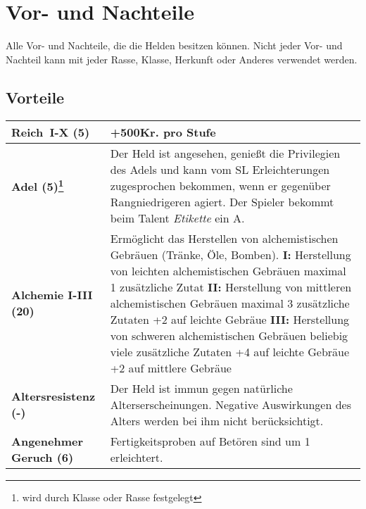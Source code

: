 {\let\clearpage\relax\chapter{Vor- und Nachteile}
\label{chap:vor_und_nachteile}}
Alle Vor- und Nachteile, die die Helden besitzen können. Nicht jeder Vor- und Nachteil kann mit jeder Rasse, Klasse, Herkunft oder Anderes verwendet werden.

\section{Vorteile}
\label{chap:vorteile}
\begin{longtable}{|p{5cm}|p{11cm}|}

\hline
\textbf{Reich~I-X (5)} & +500Kr. pro Stufe \\ \hline

\textbf{Adel (5)\footnote{wird durch Klasse oder Rasse festgelegt}} & Der Held ist angesehen, genießt die Privilegien des Adels und kann vom SL Erleichterungen zugesprochen bekommen, wenn er gegenüber Rangniedrigeren agiert. Der Spieler bekommt beim Talent \textit{Etikette} ein A. \\ \hline

\textbf{Alchemie I-III (20)} & Ermöglicht das Herstellen von alchemistischen Gebräuen (Tränke, Öle, Bomben). \newline \textbf{I:} Herstellung von leichten alchemistischen Gebräuen \newline maximal 1 zusätzliche Zutat \newline \textbf{II:} Herstellung von mittleren alchemistischen Gebräuen \newline maximal 3 zusätzliche Zutaten \newline +2 auf leichte Gebräue \newline \textbf{III:} Herstellung von schweren alchemistischen Gebräuen \newline beliebig viele zusätzliche Zutaten \newline +4 auf leichte Gebräue \newline +2 auf mittlere Gebräue \\ \hline

\textbf{Altersresistenz (-)\footnotemark[1]} & Der Held ist immun gegen natürliche Alterserscheinungen. Negative Auswirkungen des Alters werden bei ihm nicht berücksichtigt. \\ \hline

\textbf{Angenehmer Geruch (6)} & Fertigkeitsproben auf Betören sind um 1 erleichtert. \\ \hline


\end{longtable}
